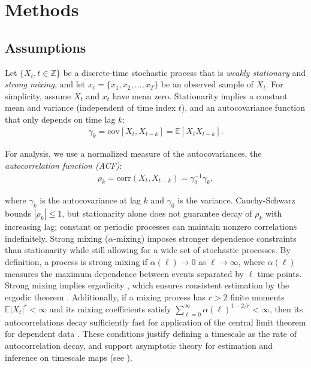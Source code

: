 \documentclass[docs/main.tex]{subfiles}
\begin{document}
\section{Methods}

\subsection{Assumptions} \label{sec:assumptions}

Let $\{X_t, t\in \mathbb{Z}\}$ be a discrete-time stochastic process that is \textit{weakly stationary} and \textit{strong mixing}, and let $x_t = \{x_1, x_2, \ldots, x_T\}$ be an observed sample of $X_t$. For simplicity, assume $X_t$ and $x_t$ have mean zero. Stationarity implies a constant mean and variance (independent of time index $t$), and an autocovariance function that only depends on time lag $k$:
\begin{align}
    \gamma_k = \text{cov}[X_t, X_{t-k}] = \mathbb{E}[X_t X_{t-k}].
\end{align}

\noindent For analysis, we use a normalized measure of the autocovariances, the \textit{autocorrelation function (ACF)}:
\begin{align} \label{eq:acf}
\rho_k = \text{corr}(X_t, X_{t-k}) = \gamma_0^{-1}\gamma_k,
\end{align}

\noindent where $\gamma_k$ is the autocovariance at lag $k$ and $\gamma_0$ is the variance. Cauchy-Schwarz bounds $|\rho_k|\le 1$, but stationarity alone does not guarantee decay of $\rho_k$ with increasing lag; constant or periodic processes can maintain nonzero correlations indefinitely. Strong mixing ($\alpha$-mixing) imposes stronger dependence constraints than stationarity while still allowing for a wide set of stochastic processes. By definition, a process is strong mixing if $\alpha(\ell) \rightarrow 0$ as $\ell \rightarrow \infty$, where $\alpha(\ell)$ measures the maximum dependence between events separated by $\ell$ time points. Strong mixing implies ergodicity \citep[Chapter~14.12]{hansen_econometrics_2022}, which ensures consistent estimation by the ergodic theorem \citep[Theorem~14.9]{hansen_econometrics_2022}. Additionally, if a mixing process has $r>2$ finite moments $\mathbb{E}|X_t|^r < \infty$ and its mixing coefficients satisfy $\sum_{\ell=0}^{\infty} \alpha(\ell)^{1-2/r} < \infty$, then its autocorrelations decay sufficiently fast for application of the central limit theorem for dependent data \citep[Theorem~14.15]{hansen_econometrics_2022}. These conditions justify defining a timescale as the rate of autocorrelation decay, and support asymptotic theory for estimation and inference on timescale maps (see ).\\
\end{document}
